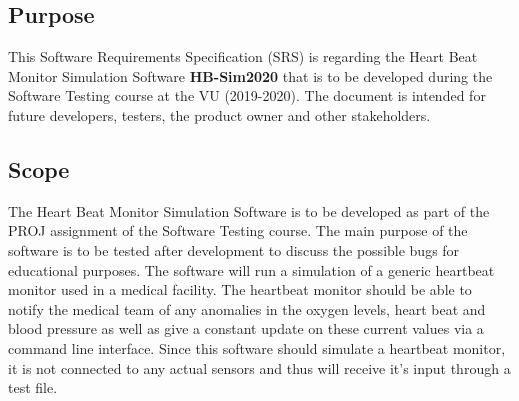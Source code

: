 \documentclass[a4paper]{article}
\begin{document}
\subsection{Purpose}

This Software Requirements Specification (SRS) is regarding the Heart Beat Monitor Simulation Software \textbf{HB-Sim2020} that is to be developed during the Software Testing course at the VU (2019-2020). The document is intended for future developers, testers, the product owner and other stakeholders.

\subsection{Scope}

The  Heart Beat Monitor Simulation Software is to be developed as part of the PROJ assignment of the Software Testing course. The main purpose of the software is to be  tested after development to discuss the possible bugs for educational purposes. The software will run a simulation of a generic heartbeat monitor used in a medical facility. The heartbeat monitor should be able to notify the medical team of any anomalies in the oxygen levels, heart beat and blood pressure as well as give a constant update on these current values via a command line interface. Since this software should simulate a heartbeat monitor, it is not connected to any actual sensors and thus will receive it's input through a test file. 
\end{document}
